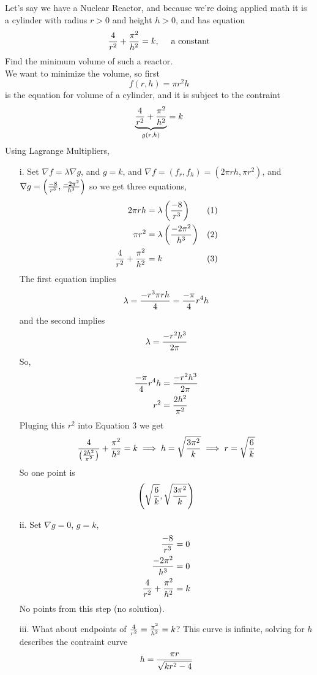 \documentclass[english, 11pt]{article}
\begin{document}
\begin{exmp}
  Let's say we have a Nuclear Reactor, and because we're doing applied math it is a cylinder with radius $r>0$ and height $h>0$, and has equation
  \[ \frac{4}{r^2} + \frac{\pi^2}{h^2} = k, \mbox{ \ \ \ a constant} \]
  Find the minimum volume of such a reactor. \\

  We want to minimize the volume, so first
  \[ f(r,h) = \pi r^2 h \]
  is the equation for volume of a cylinder, and it is subject to the contraint
  \[ \underbrace{\frac{4}{r^2} + \frac{\pi^2}{h^2}}_{g(r,h)} = k \]
  Using Lagrange Multipliers,
  \begin{itemize}
    \item[i.] Set $\nabla f = \lambda \nabla g$, and $g = k$, and $\nabla f = (f_r,f_h) = (2\pi r h, \pi r^2)$, and $\nabla g = \left( \frac{-8}{r^3}, \frac{-2\pi^2}{h^3} \right)$ so we get three equations,
    \begin{align*}
      2\pi r h & = \lambda \left( \frac{-8}{r^3} \right) & (1)\\
      \pi r^2 & = \lambda \left( \frac{-2\pi^2}{h^3} \right) & (2) \\
      \frac{4}{r^2} + \frac{\pi^2}{h^2}&  = k & (3)
    \end{align*}
    The first equation implies
    \[ \lambda = \frac{-r^3 \pi r h}{4} = \frac{-\pi}{4} r^4 h \]
    and the second implies
    \[ \lambda = \frac{-r^2h^3}{2\pi} \]
    So,
    \begin{align*}
        \frac{-\pi}{4} r^4 h & =  \frac{-r^2h^3}{2\pi} \\
        r^2 & = \frac{2h^2}{\pi^2}
    \end{align*}
    Pluging this $r^2$ into Equation 3 we get
    \[ \frac{4}{\left( \frac{2h^2}{\pi^2} \right)}  + \frac{\pi^2}{h^2} = k \implies h = \sqrt{\frac{3\pi^2}{k}} \implies r = \sqrt{\frac{6}{k}} \]
    So one point is
    \[ \left( \sqrt{\frac{6}{k}},  \sqrt{\frac{3\pi^2}{k}} \right) \]
    \item[ii.] Set $\nabla g = 0$, $g = k$,
    \begin{align*}
      \frac{-8}{r^3} & = 0 \\
      \frac{-2\pi^2}{h^3} & = 0 \\
      \frac{4}{r^2} + \frac{\pi^2}{h^2}&  = k
    \end{align*}
    No points from this step (no solution).
    \item[iii.] What about endpoints of $\frac{4}{r^2} = \frac{\pi^2}{h^2} = k$? This curve is infinite, solving for $h$ describes the contraint curve
    \[ h = \frac{\pi r}{\sqrt{kr^2 - 4}} \]

\end{itemize}
\end{exmp}
\end{document}
